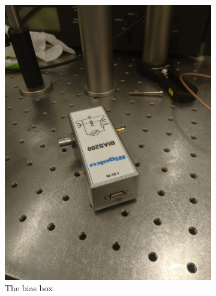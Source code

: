 \documentclass[a4paper, 10pt]{article}
\begin{document}
\begin{figure}[h]
\begin{subfigure}{0.4\textwidth}
        \includegraphics[width=\textwidth,angle=-90]{./images/pin-bias-box.jpg}
        \caption{The bias box}
        \label{fig:pin-diode}
    \end{subfigure}
    \begin{subfigure}{0.4\textwidth}
        \centering

\end{subfigure}
\end{figure}
\end{document}
